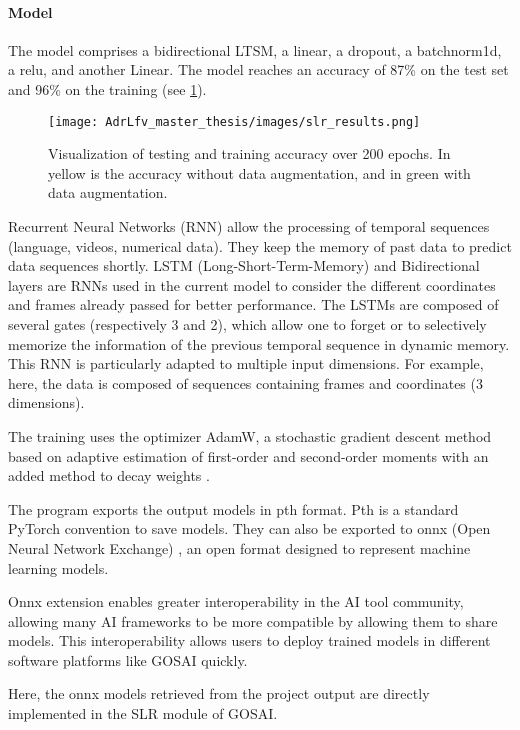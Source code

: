 \paragraph{Model}

The model comprises a bidirectional LTSM, a linear, a dropout, a batchnorm1d, a relu, and another Linear. The model reaches an accuracy of 87\% on the test set and 96\% on the training (see \ref{fig:slr_results}).

\begin{figure}[h]
    \centering
    \texttt{[image: AdrLfv\_master\_thesis/images/slr\_results.png]}
    \caption{Visualization of testing and training accuracy over 200 epochs. In yellow is the accuracy without data augmentation, and in green with data augmentation.}
    \label{fig:slr_results}
\end{figure}

Recurrent Neural Networks (RNN) allow the processing of temporal sequences (language, videos, numerical data). They keep the memory of past data to predict data sequences shortly. 
LSTM (Long-Short-Term-Memory) and Bidirectional layers are RNNs used in the current model to consider the different coordinates and frames already passed for better performance. The LSTMs are composed of several gates (respectively 3 and 2), which allow one to forget or to selectively memorize the information of the previous temporal sequence in dynamic memory. This RNN is particularly adapted to multiple input dimensions. For example, here, the data is composed of sequences containing frames and coordinates (3 dimensions).
  
The training uses the optimizer AdamW, a stochastic gradient descent method based on adaptive estimation of first-order and second-order moments with an added method to decay weights \cite{loshchilov2017decoupled}. 

The program exports the output models in pth format. Pth is a standard PyTorch convention to save models. They can also be exported to onnx (Open Neural Network Exchange) \cite{onnx}, an open format designed to represent machine learning models.

Onnx extension enables greater interoperability in the AI tool community, allowing many AI frameworks to be more compatible by allowing them to share models. This interoperability allows users to deploy trained models in different software platforms like GOSAI quickly.

Here, the onnx models retrieved from the project output are directly implemented in the SLR module of GOSAI.


